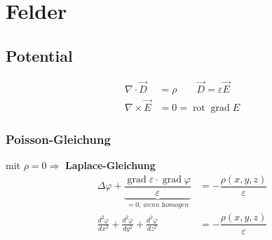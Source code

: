 \section{Felder}

\subsection{Potential}
\begin{align*}
    \nabla \cdot \vec{D}  &= \rho       \qquad          \vec{D} = \varepsilon \vec{E}\\
    \nabla \times \vec{E} &= 0 = \operatorname{rot} \operatorname{grad} E
\end{align*}

\subsubsection{Poisson-Gleichung}
mit $\rho = 0 \Rightarrow$ \textbf{Laplace-Gleichung}
\begin{align*}
    \Delta \varphi + \underbrace{ \dfrac{\operatorname{grad} \varepsilon \cdot \operatorname{grad} \varphi}{\varepsilon}}_{= 0\textit{, wenn homogen}}       
                                &= - \dfrac{\rho (x, y, z)}{\varepsilon}\\
    \frac{d^2 \varphi}{d x^2} + \frac{d^2 \varphi}{d y^2} + \frac{d^2 \varphi}{d z^2}
                                &= - \dfrac{\rho (x, y, z)}{\varepsilon}
\end{align*}